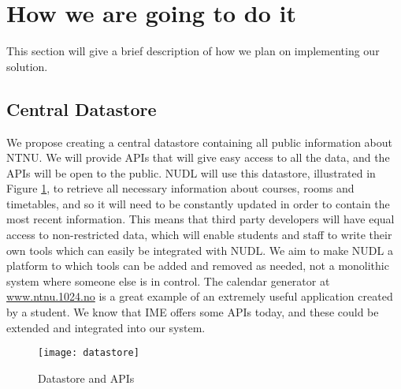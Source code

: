 \section{How we are going to do it}
	This section will give a brief description of how we plan on implementing our solution. 
	
	\subsection{Central Datastore}
		We propose creating a central datastore containing all public information about NTNU. We will provide APIs that will give easy access to all the data, and the APIs will be open to the public. 
NUDL will use this datastore, illustrated in Figure \ref{fig:datastore}, to retrieve all necessary information about courses, rooms and timetables, and so it will need to be constantly updated in order to contain the most recent information. This means that third party developers will have equal access to non-restricted data, which will enable students and staff to write their own tools which can easily be integrated with NUDL. We aim to make NUDL a platform to which tools can be added and removed as needed, not a monolithic system where someone else is in control. The calendar generator at \url{www.ntnu.1024.no} is a great example of an extremely useful application created by a student. We know that IME offers some APIs today, and these could be extended and integrated into our system.
\begin{figure}[h]
\centering
\texttt{[image: datastore]}
\caption{Datastore and APIs}
\label{fig:datastore}
\end{figure}


